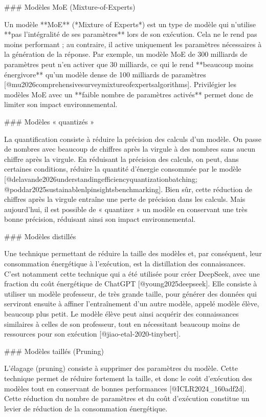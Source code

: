 ### Modèles MoE (Mixture-of-Experts)

Un modèle **MoE** (*Mixture of Experts*) est un type de modèle qui n'utilise **pas l'intégralité de ses paramètres** lors de son exécution. Cela ne le rend pas moins performant ; au contraire, il active uniquement les paramètres nécessaires à la génération de la réponse. Par exemple, un modèle MoE de 300 milliards de paramètres peut n'en activer que 30 milliards, ce qui le rend **beaucoup moins énergivore** qu'un modèle dense de 100 milliards de paramètres [@mu2026comprehensivesurveymixtureofexpertsalgorithms].
Privilégier les modèles MoE avec un **faible nombre de paramètres activés** permet donc de limiter son impact environnemental.

### Modèles « quantizés »

La quantification consiste à réduire la précision des calculs d'un modèle. On passe de nombres avec beaucoup de chiffres après la virgule à des nombres sans aucun chiffre après la virgule. En réduisant la précision des calculs, on peut, dans certaines conditions, réduire la quantité d'énergie consommée par le modèle [@delavande2026understandingefficiencyquantizationbatching; @poddar2025sustainablenlpinsightsbenchmarking].
Bien sûr, cette réduction de chiffres après la virgule entraîne une perte de précision dans les calculs. Mais aujourd'hui, il est possible de « quantizer » un modèle en conservant une très bonne précision, réduisant ainsi son impact environnemental.

### Modèles distillés

Une technique permettant de réduire la taille des modèles et, par conséquent, leur consommation énergétique à l'exécution, est la distillation des connaissances.
C'est notamment cette technique qui a été utilisée pour créer DeepSeek, avec une fraction du coût énergétique de ChatGPT [@young2025deepseek].
Elle consiste à utiliser un modèle professeur, de très grande taille, pour générer des données qui serviront ensuite à affiner l'entraînement d'un autre modèle, appelé modèle élève, beaucoup plus petit. Le modèle élève peut ainsi acquérir des connaissances similaires à celles de son professeur, tout en nécessitant beaucoup moins de ressources pour son exécution [@jiao-etal-2020-tinybert].

### Modèles taillés (Pruning)

L'élagage (pruning) consiste à supprimer des paramètres du modèle. Cette technique permet de réduire fortement la taille, et donc le coût d'exécution des modèles tout en conservant de bonnes performances [@ICLR2024_160adf2d]. Cette réduction du nombre de paramètres et du coût d'exécution constitue un levier de réduction de la consommation énergétique.

